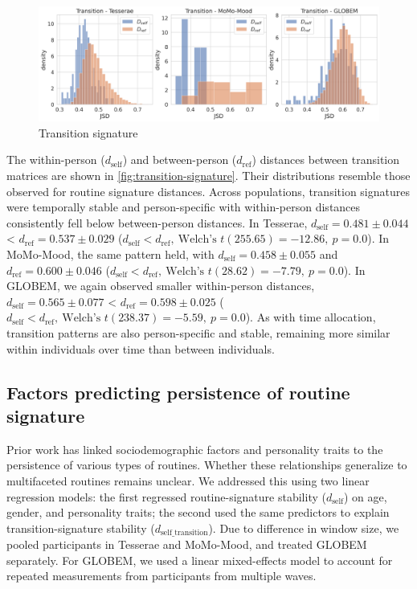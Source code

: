 \documentclass[pdflatex,sn-vancouver,Numbered]{bst/sn-jnl}%
\theoremstyle{thmstyleone}%
\theoremstyle{thmstyletwo}%
\theoremstyle{thmstylethree}%
\newcommand{\dself}[2]{$d_{\text{self}} = #1 \pm #2$}
\newcommand{\dref}[2]{$d_{\text{ref}} = #1 \pm #2$}
\newcommand{\dselfdrefp}[3]{$d_{\text{self}} < d_{\text{ref}},\ \text{Welch's } t(#1) = #2,\ p = #3$}
\begin{document}
\begin{figure}
    \centering
    \includegraphics[width=1\linewidth]{figures/combined_transition_dself_dref_jsd.png}
    \caption{Transition signature}
    \label{fig:transition-signature}
\end{figure}

The within-person (\(d_{\text{self}}\)) and between-person (\(d_{\text{ref}}\)) distances between transition matrices are shown in \autoref{fig:transition-signature}. Their distributions resemble those observed for routine signature distances.
Across populations, transition signatures were temporally stable and person-specific with within-person distances consistently fell below between-person distances. In Tesserae, \dself{0.481}{0.044} < \dref{0.537}{0.029} (\dselfdrefp{255.65}{-12.86}{0.0}). In MoMo-Mood, the same pattern held, with \dself{0.458}{0.055} and \dref{0.600}{0.046} (\dselfdrefp{28.62}{-7.79}{0.0}). In GLOBEM, we again observed smaller within-person distances, \dself{0.565}{0.077} < \dref{0.598}{0.025} (\dselfdrefp{238.37}{-5.59}{0.0}). As with time allocation, transition patterns are also person-specific and stable, remaining more similar within individuals over time than between individuals.

\subsection*{Factors predicting persistence of routine signature}\label{sec3.3}

Prior work has linked sociodemographic factors \cite{luong2023impact, luong2024sleep, kulshrestha2021web} and personality traits \cite{centellegherPersonalityTraitsEgonetwork2017, alessandrettiUnderstandingInterplaySocial2018, amon2022flexibility} to the persistence of various types of routines.  Whether these relationships generalize to multifaceted routines remains unclear. We addressed this using two linear regression models: the first regressed routine-signature stability ($d_{\text{self}}$) on age, gender, and personality traits; the second used the same predictors to explain transition-signature stability ($d_{\text{self\_transition}}$). Due to difference in window size, we pooled participants in Tesserae and MoMo-Mood, and treated GLOBEM separately. For GLOBEM, we used a linear mixed-effects model to account for repeated measurements from participants from multiple waves.
\end{document}
